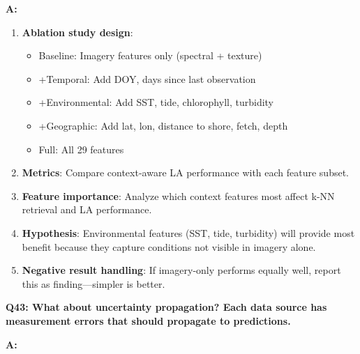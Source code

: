 \documentclass[11pt]{article}
\begin{document}
\textbf{A:}

\begin{enumerate}
    \item \textbf{Ablation study design}:
    \begin{itemize}
        \item Baseline: Imagery features only (spectral + texture)
        \item +Temporal: Add DOY, days since last observation
        \item +Environmental: Add SST, tide, chlorophyll, turbidity
        \item +Geographic: Add lat, lon, distance to shore, fetch, depth
        \item Full: All 29 features
    \end{itemize}

    \item \textbf{Metrics}: Compare context-aware LA performance with each feature subset.

    \item \textbf{Feature importance}: Analyze which context features most affect k-NN retrieval and LA performance.

    \item \textbf{Hypothesis}: Environmental features (SST, tide, turbidity) will provide most benefit because they capture conditions not visible in imagery alone.

    \item \textbf{Negative result handling}: If imagery-only performs equally well, report this as finding---simpler is better.
\end{enumerate}

\textbf{Q43: What about uncertainty propagation? Each data source has measurement errors that should propagate to predictions.}

\textbf{A:}
\end{document}

